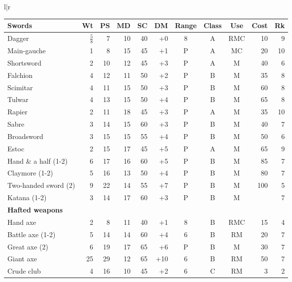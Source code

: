 \begin{tabular}[t]{l|r}
\begin{minipage}[t]{4.7in}
\renewcommand{\thefootnote}{\Alph{footnote}}
\begin{tabularx}{\linewidth}[t]{Xrrrrrcccrr}
\textbf{Swords} & \tiny\textbf{Wt} & \tiny\textbf{PS} & \tiny\textbf{MD} & \tiny\textbf{SC} & \tiny\textbf{DM} &
\tiny\textbf{Range} & \tiny\textbf{Class} & \tiny\textbf{Use} & \tiny\textbf{Cost} & \tiny\textbf{Rk} \\ \hline
Dagger\footnotemark	&$\frac{5}{8}$& 7& 10	& 40	& +0	& 8	& A	& RMC	& 10	& 9 \\ \hline
Main-gauche	& 1	& 8	& 15	& 45	& +1	& P	& A	& MC	& 20	& 10 \\ \hline
Shortsword	& 2	& 10	& 12	& 45	& +3	& P	& A	& M	& 40	& 6 \\ \hline
Falchion	& 4	& 12	& 11	& 50	& +2	& P	& B	& M	& 35	& 8 \\ \hline
Scimitar	& 4	& 11	& 15	& 50	& +3	& P	& B	& M	& 60	& 8 \\ \hline
Tulwar		& 4	& 13	& 15	& 50	& +4	& P	& B	& M	& 65	& 8 \\ \hline
Rapier		& 2	& 11	& 18	& 45	& +3	& P	& A	& M	& 35	& 10 \\ \hline
Sabre		& 3	& 14	& 15	& 60	& +3	& P	& B	& M	& 40	& 7 \\ \hline
Broadsword	& 3	& 15	& 15	& 55	& +4	& P	& B	& M	& 50	& 6 \\ \hline
Estoc		& 2	& 15	& 17	& 45	& +5	& P	& A	& M	& 65	& 9 \\ \hline
Hand \& a half (1-2)& 6	& 17	& 16	& 60	& +5	& P	& B	& M	& 85	& 7 \\ \hline
Claymore (1-2)	& 5	& 16	& 13	& 50	& +4	& P	& B	& M	& 80	& 7 \\ \hline
Two-handed sword (2)& 9	& 22	& 14	& 55	& +7	& P	& B	& M	& 100	& 5 \\ \hline
Katana (1-2)	& 3	& 14	& 17	& 60	& +3	& P	& B	& M	& 	& 7 \\ \hline
\multicolumn{11}{l}{\textbf{Hafted weapons}} \\ \hline
Hand axe	& 2	& 8	& 11	& 40	& +1	& 8	& B	& RMC	& 15	& 4 \\ \hline
Battle axe (1-2)& 5	& 14	& 14	& 60	& +4	& 6	& B	& RM	& 20	& 7 \\ \hline
Great axe (2)	& 6	& 19	& 17	& 65	& +6	& P	& B	& M	& 30	& 7 \\ \hline
Giant axe\footnotemark	& 25	& 29	& 12	& 65	& +10	& 6	& B	& RM	& 50	& 7 \\ \hline
Crude club	& 4	& 16	& 10	& 45	& +2	& 6	& C	& RM	& 3	& 2 \\ \hline

\end{tabularx}
\end{minipage}
\end{tabular}
